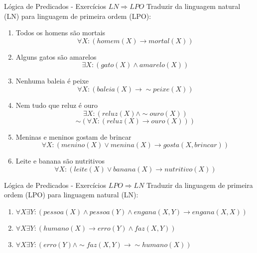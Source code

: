 \begin{frame}[t]{Lógica de Predicados - Exercícios $LN \Rightarrow LPO$}
	Traduzir da linguagem natural (LN) para linguagem de primeira ordem (LPO):
	
	\begin{footnotesize}
	\begin{enumerate}
	\item Todos os homens são mortais $$\forall X: (homem(X) \rightarrow mortal(X))$$
	\item Alguns gatos são amarelos $$\exists X: (gato(X) \wedge amarelo(X))$$
	\item Nenhuma baleia é peixe $$\forall X: (baleia(X) \rightarrow\sim peixe(X))$$
	\item Nem tudo que reluz é ouro $$\exists X: (reluz(X) \wedge\sim ouro(X))$$ $$\sim (\forall X: (reluz(X) \rightarrow ouro(X)))$$
	\item Meninas e meninos gostam de brincar $$\forall X: (menino(X) \vee menina(X) \rightarrow gosta(X, brincar))$$
	\item Leite e banana são nutritivos	$$\forall X: (leite(X) \vee banana(X) \rightarrow nutritivo(X))$$
	\end{enumerate}
	\end{footnotesize}
\end{frame}

\begin{frame}[t]{Lógica de Predicados - Exercícios $LPO \Rightarrow LN$}
	Traduzir da linguagem de primeira ordem (LPO) para linguagem natural (LN):
	
	\begin{enumerate}
	\item $\forall X \exists Y: (pessoa(X) \wedge pessoa(Y) \wedge engana(X,Y) \rightarrow engana(X,X))$
	\item $\forall X \exists Y: (humano(X) \rightarrow erro(Y) \wedge faz(X,Y))$ 
	\item $\forall X \exists Y: (erro(Y) \wedge\sim faz(X,Y) \rightarrow\sim humano(X))$
	\end{enumerate}
\end{frame}

